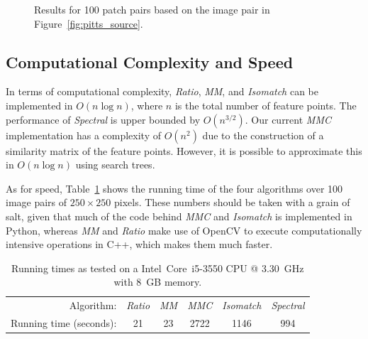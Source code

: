 \begin{figure}[htb]
\begin{subfigure}[c]{.8\textwidth}
	\end{subfigure}%
	\caption{Results for 100 patch pairs based on the image pair in 
	Figure~\ref{fig:pitts_source}.}
	\label{fig:result_pitts}
\end{figure}

\subsection{Computational Complexity and Speed}

In terms of computational complexity, \emph{Ratio}, \emph{MM}, and 
\emph{Isomatch} can be implemented in $O(n\log n)$, where $n$ is the 
total number of feature points. The performance of \emph{Spectral} is 
upper bounded by $O(n^{3/2})$. Our current \emph{MMC} implementation has 
a complexity of $O(n^2)$ due to the construction of a similarity matrix 
of the feature points.  However, it is possible to approximate this in 
$O(n\log n)$ using search trees.  

As for speed, Table~\ref{table:running_times} shows the running time of 
the four algorithms over 100 image pairs of $250\!\times\!250$ pixels.  
These numbers should be taken with a grain of salt, given that much of 
the code behind \emph{MMC} and \emph{Isomatch} is implemented in Python, 
whereas \emph{MM} and \emph{Ratio} make use of OpenCV to execute 
computationally intensive operations in C++, which makes them much 
faster. 

\begin{table}[htb]
\caption{Running times as tested on a Intel\textregistered\ Core\texttrademark\ i5-3550 CPU @ 
3.30~GHz with 8~GB memory.}
\label{table:running_times}
	\centering
\begin{tabular}{r*{5}{c}}
\hline
	Algorithm: & \emph{Ratio} & \emph{MM} & \emph{MMC} %
& \emph{Isomatch} & \emph{Spectral}	\\
	\noalign{\smallskip} 
	Running time (seconds): & 21 & 23 & 2722 & 1146 & 994\\
	\hline
\end{tabular}
\end{table}
